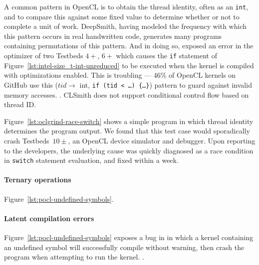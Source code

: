 A common pattern in OpenCL is to obtain the thread identity, often as an \texttt{int}, and to compare this against some fixed value to determine whether or not to complete a unit of work. DeepSmith, having modeled the frequency with which this pattern occurs in real handwritten code, generates many programs containing permutations of this pattern. And in doing so, exposed an error in the optimizer of two Testbeds $4+$, $6+$ which causes the \texttt{if} statement of Figure~\ref{lst:intel-size_t-int-unreduced} to be executed when the kernel is compiled with optimizations enabled.
%
 This is troubling --- 46\% of OpenCL kernels on GitHub use this ($tid \rightarrow$ int, \texttt{if (tid < \ldots) \{\ldots\}}) pattern to guard against invalid memory accesses. . CLSmith does not support conditional control flow based on thread ID. %

Figure~\ref{lst:oclgrind-race-switch} shows a simple program in which thread identity determines the program output. We found that this test case would sporadically crash Testbeds~$10\pm$, an OpenCL device simulator and debugger. Upon reporting to the developers, the underlying cause was quickly diagnosed as a race condition in \texttt{switch} statement evaluation, and fixed within a week.

\paragraph{Ternary operations} Figure~\ref{lst:pocl-undefined-symbols}.

\paragraph{Latent compilation errors} Figure~\ref{lst:pocl-undefined-symbols} exposes a bug in in which a kernel containing an undefined symbol will successfully compile without warning, then crash the program when attempting to run the kernel. .



